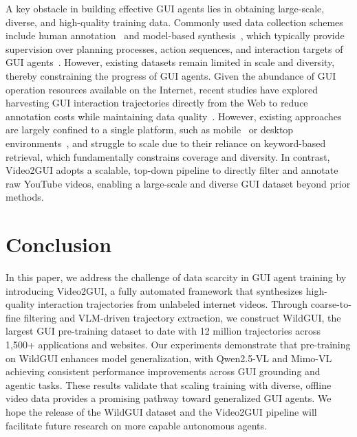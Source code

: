 \documentclass{article}
\theoremstyle{plain}
\theoremstyle{definition}
\theoremstyle{remark}
\begin{document}
A key obstacle in building effective GUI agents lies in obtaining large-scale, diverse, and high-quality training data. Commonly used data collection schemes include human annotation~\citep{deng2023mind2web, li2024effects} and model-based synthesis~\citep{li2024effects, lu2025guiodyssey}, which typically provide supervision over planning processes, action sequences, and interaction targets of GUI agents~\citep{cheng2024seeclick, lu2024omniparser}. However, existing datasets remain limited in scale and diversity, thereby constraining the progress of GUI agents.
Given the abundance of GUI operation resources available on the Internet, recent studies have explored harvesting GUI interaction trajectories directly from the Web to reduce annotation costs while maintaining data quality~\citep{lu2025videoagenttrek, zhang2025tongui}. However, existing approaches are largely confined to a single platform, such as mobile~\citep{jang2025scalable} or desktop environments~\citep{song2025watch}, and struggle to scale due to their reliance on keyword-based retrieval, which fundamentally constrains coverage and diversity. In contrast, Video2GUI adopts a scalable, top-down pipeline to directly filter and annotate raw YouTube videos, enabling a large-scale and diverse GUI dataset beyond prior methods.


\section{Conclusion}
In this paper, we address the challenge of data scarcity in GUI agent training by introducing Video2GUI, a fully automated framework that synthesizes high-quality interaction trajectories from unlabeled internet videos. Through coarse-to-fine filtering and VLM-driven trajectory extraction, we construct WildGUI, the largest GUI pre-training dataset to date with 12 million trajectories across 1,500+ applications and websites. Our experiments demonstrate that pre-training on WildGUI enhances model generalization, with Qwen2.5-VL and Mimo-VL achieving consistent performance improvements across GUI grounding and agentic tasks. These results validate that scaling training with diverse, offline video data provides a promising pathway toward generalized GUI agents. We hope the release of the WildGUI dataset and the Video2GUI pipeline will facilitate future research on more capable autonomous agents.
\end{document}
